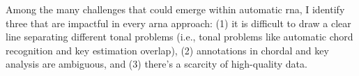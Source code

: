 

Among the many challenges that could emerge within automatic
\gls{rna}, I identify three that are impactful
in every \gls{arna} approach: (1) it is difficult to draw a clear line separating
different tonal problems (i.e., tonal problems like automatic chord recognition and key estimation overlap), (2)
annotations in chordal and key analysis are ambiguous, and (3) there's a scarcity of high-quality data.
